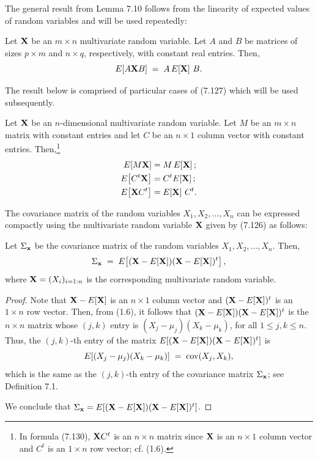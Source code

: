 The general result from Lemma 7.10 follows from the linearity of expected values of
random variables and will be used repeatedly:

\begin{lemma}
Let $\mathbf{X}$ be an $m \times n$ multivariate random variable. Let $A$ and $B$ be matrices
of sizes $p \times m$ and $n \times q$, respectively, with constant real entries. Then,
\begin{equation}
E\!\left[A\mathbf{X} B\right] \;=\; A\,E\!\left[\mathbf{X}\right]\,B.
\end{equation}
\end{lemma}

The result below is comprised of particular cases of (7.127) which will be used
subsequently.

\begin{lemma}
Let $\mathbf{X}$ be an $n$-dimensional multivariate random variable. Let $M$ be an $m\times n$
matrix with constant entries and let $C$ be an $n\times 1$ column vector with constant
entries. Then,\footnote{In formula (7.130), $\mathbf{X} C^t$ is an $n \times n$ matrix since
$\mathbf{X}$ is an $n \times 1$ column vector and $C^t$ is an $1 \times n$ row vector; cf.
(1.6).}
\begin{align}
E\!\left[M\mathbf{X}\right] &= M\,E\!\left[\mathbf{X}\right]; \\
E\!\left[C^t\mathbf{X}\right] &= C^tE\!\left[\mathbf{X}\right]; \\
E\!\left[\mathbf{X} C^t\right] &= E\!\left[\mathbf{X}\right]\,C^t.
\end{align}
\end{lemma}

The covariance matrix of the random variables $X_1, X_2, \ldots, X_n$ can be expressed
compactly using the multivariate random variable $\mathbf{X}$ given by (7.126) as follows:

\begin{lemma}
Let $\Sigma_{\mathbf{x}}$ be the covariance matrix of the random variables $X_1, X_2, \ldots,
X_n$. Then,
\begin{equation}
\Sigma_{\mathbf{x}} \;=\; E\!\left[(\mathbf{X} - E\!\left[\mathbf{X}\right])(\mathbf{X} - E\!\left[\mathbf{X}\right])^t\right],
\end{equation}
where $\mathbf{X} = (X_i)_{i=1:n}$ is the corresponding multivariate random variable.
\end{lemma}

\begin{proof}
Note that $\mathbf{X} - E\!\left[\mathbf{X}\right]$ is an $n \times 1$ column vector and $(\mathbf{X} - E\!\left[\mathbf{X}\right])^t$ is
an $1 \times n$ row vector. Then, from (1.6), it follows that $(\mathbf{X} - E\!\left[\mathbf{X}\right])(\mathbf{X} -
E\!\left[\mathbf{X}\right])^t$ is the $n \times n$ matrix whose $(j,k)$ entry is $(X_j - \mu_j)(X_k -
\mu_k)$, for all $1 \le j,k \le n$. Thus, the $(j,k)$-th entry of the matrix
$E\!\left[(\mathbf{X}-E\!\left[\mathbf{X}\right])(\mathbf{X}-E\!\left[\mathbf{X}\right])^t\right]$ is
\begin{equation}
E\!\left[(X_j-\mu_j)(X_k-\mu_k)\right] \;=\; \operatorname{cov}(X_j,X_k),
\end{equation}
which is the same as the $(j,k)$-th entry of the covariance matrix $\Sigma_{\mathbf{x}}$; see
Definition 7.1.

We conclude that $\Sigma_{\mathbf{x}} = E\!\left[(\mathbf{X}-E\!\left[\mathbf{X}\right])(\mathbf{X}-E\!\left[\mathbf{X}\right])^t\right]$.
\end{proof}

